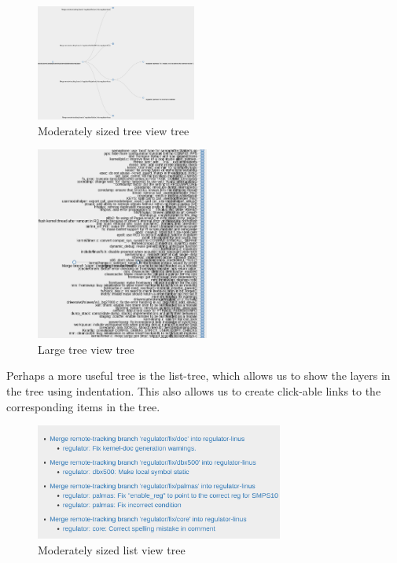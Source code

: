 \documentclass[conference, draftclsnofoot]{IEEEtran}
\begin{document}
\begin{figure}[h]
	\centering
	\includegraphics[height=1.5in]{figures/tree_viewer.png}
	\caption{Moderately sized tree view tree}
	\label{fig:moderate_tree_view}
\end{figure}

\begin{figure}[h]
	\centering
	\includegraphics[height=2.5in]{figures/tree_viewer_large.png}
	\caption{Large tree view tree}
	\label{fig:large_tree_view}
\end{figure}

Perhaps a more useful tree is the list-tree, which allows us to show the
layers in the tree using indentation. This also allows us to create click-able
links to the corresponding items in the tree.

\begin{figure}[h]
	\centering
	\includegraphics[height=1.5in]{figures/list_viewer.png}
	\caption{Moderately sized list view tree}
	\label{fig:moderate_list_view}
\end{figure}
\end{document}
